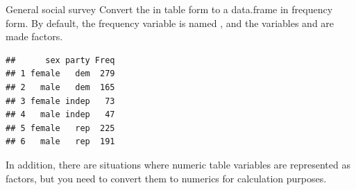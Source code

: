 \documentclass[11pt]{book}
\renewenvironment{knitrout}{\small\renewcommand{\baselinestretch}{.85}}{} %
\begin{document}
\begin{Example}{General social survey}
Convert the  in table form to a data.frame in frequency form.
By default, the frequency variable is named , and the variables
 and  are made factors.
\begin{knitrout}
\color{fgcolor}\begin{kframe}
\begin{alltt}
\end{alltt}
\begin{verbatim}
##      sex party Freq
## 1 female   dem  279
## 2   male   dem  165
## 3 female indep   73
## 4   male indep   47
## 5 female   rep  225
## 6   male   rep  191
\end{verbatim}
\end{kframe}
\end{knitrout}
\end{Example}

In addition, there are situations where numeric table variables are represented as
factors, but you need to
convert them to numerics for calculation purposes.
\end{document}
